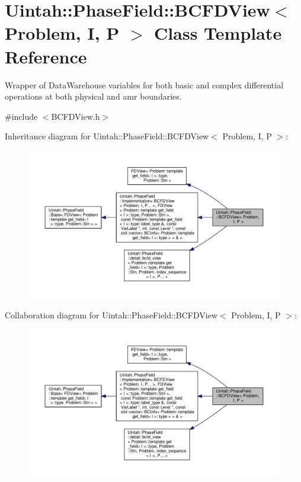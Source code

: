 \hypertarget{classUintah_1_1PhaseField_1_1BCFDView}{}\section{Uintah\+:\+:Phase\+Field\+:\+:B\+C\+F\+D\+View$<$ Problem, I, P $>$ Class Template Reference}
\label{classUintah_1_1PhaseField_1_1BCFDView}


Wrapper of Data\+Warehouse variables for both basic and complex differential operations at both physical and amr boundaries.  




{\ttfamily \#include $<$B\+C\+F\+D\+View.\+h$>$}



Inheritance diagram for Uintah\+:\+:Phase\+Field\+:\+:B\+C\+F\+D\+View$<$ Problem, I, P $>$\+:\nopagebreak
\begin{figure}[H]
\begin{center}
\leavevmode
\includegraphics[width=350pt]{classUintah_1_1PhaseField_1_1BCFDView__inherit__graph}
\end{center}
\end{figure}


Collaboration diagram for Uintah\+:\+:Phase\+Field\+:\+:B\+C\+F\+D\+View$<$ Problem, I, P $>$\+:\nopagebreak
\begin{figure}[H]
\begin{center}
\leavevmode
\includegraphics[width=350pt]{classUintah_1_1PhaseField_1_1BCFDView__coll__graph}
\end{center}
\end{figure}
